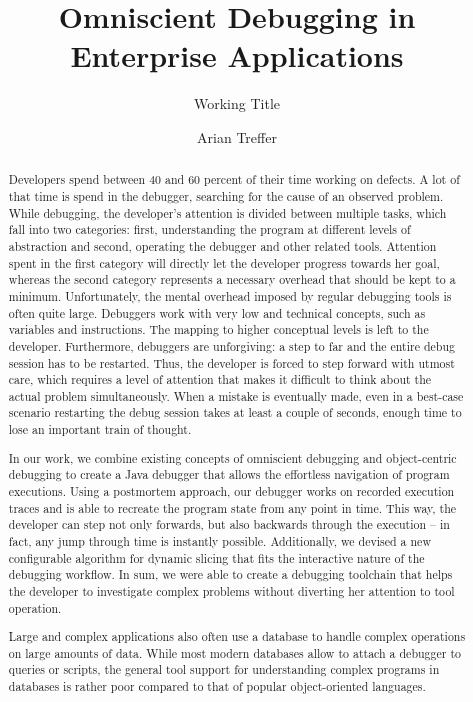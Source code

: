 \documentclass[english]{scrartcl}
\title{Omniscient Debugging in Enterprise Applications}
\subtitle{Working Title}
\author{Arian Treffer}
\begin{document}
\maketitle

\begin{abstract}
Developers spend between 40 and 60 percent of their time working on defects.
A lot of that time is spend in the debugger, searching for the cause of an observed problem.
While debugging, the developer's attention is divided between multiple tasks, which fall into two categories:
first, understanding the program at different levels of abstraction and second, operating the debugger and other related tools.
Attention spent in the first category will directly let the developer progress towards her goal, whereas the second category represents a necessary overhead that should be kept to a minimum.
Unfortunately, the mental overhead imposed by regular debugging tools is often quite large.
Debuggers work with very low and technical concepts, such as variables and instructions.
The mapping to higher conceptual levels is left to the developer.
Furthermore, debuggers are unforgiving: a step to far and the entire debug session has to be restarted.
Thus, the developer is forced to step forward with utmost care, which requires a level of attention that makes it difficult to think about the actual problem simultaneously.
When a mistake is eventually made, even in a best-case scenario restarting the debug session takes at least a couple of seconds, enough time to lose an important train of thought.

In our work, we combine existing concepts of omniscient debugging and object-centric debugging to create a Java debugger that allows the effortless navigation of program executions. 
Using a postmortem approach, our debugger works on recorded execution traces and is able to recreate the program state from any point in time.
This way, the developer can step not only forwards, but also backwards through the execution -- in fact, any jump through time is instantly possible.
Additionally, we devised a new configurable algorithm for dynamic slicing that fits the interactive nature of the debugging workflow.
In sum, we were able to create a debugging toolchain that helps the developer to investigate complex problems without diverting her attention to tool operation.

Large and complex applications also often use a database to handle complex operations on large amounts of data.
While most modern databases allow to attach a debugger to queries or scripts, the general tool support for understanding complex programs in databases is rather poor compared to that of popular object-oriented languages.


\end{abstract}
\end{document}

